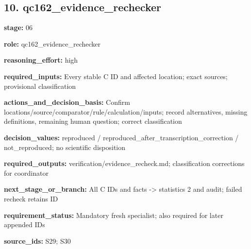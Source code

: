 \documentclass[10pt,a4paper]{article}
\begin{document}
\subsection*{10.\allowbreak{} qc162\_\allowbreak{}evidence\_\allowbreak{}rechecker}
\textbf{stage:} 06\par
\textbf{role:} qc162\_\allowbreak{}evidence\_\allowbreak{}rechecker\par
\textbf{reasoning\_\allowbreak{}effort:} high\par
\textbf{required\_\allowbreak{}inputs:} Every stable C ID and affected location; exact sources; provisional classification\par
\textbf{actions\_\allowbreak{}and\_\allowbreak{}decision\_\allowbreak{}basis:} Confirm locations/\allowbreak{}source/\allowbreak{}comparator/\allowbreak{}rule/\allowbreak{}calculation/\allowbreak{}inputs; record alternatives, missing definitions, remaining human question; correct classification\par
\textbf{decision\_\allowbreak{}values:} reproduced /\allowbreak{} reproduced\_\allowbreak{}after\_\allowbreak{}transcription\_\allowbreak{}correction /\allowbreak{} not\_\allowbreak{}reproduced; no scientific disposition\par
\textbf{required\_\allowbreak{}outputs:} verification/\allowbreak{}evidence\_\allowbreak{}recheck.\allowbreak{}md; classification corrections for coordinator\par
\textbf{next\_\allowbreak{}stage\_\allowbreak{}or\_\allowbreak{}branch:} All C IDs and facts -\allowbreak{}> statistics 2 and audit; failed recheck retains ID\par
\textbf{requirement\_\allowbreak{}status:} Mandatory fresh specialist; also required for later appended IDs\par
\textbf{source\_\allowbreak{}ids:} S29; S30\par
\end{document}
